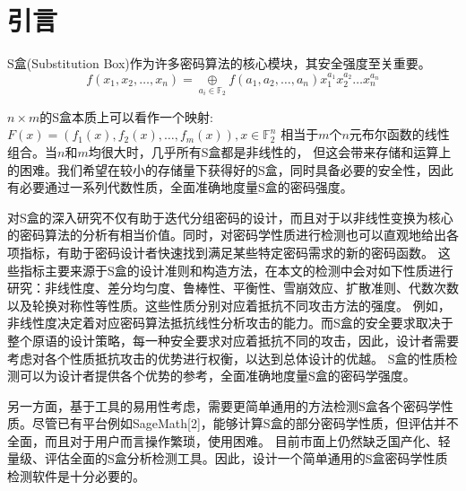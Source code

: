 \documentclass{xduugthesis}
\begin{document}
\frontmatter
\mainmatter
\chapter{引言}
S盒(Substitution Box)作为许多密码算法的核心模块，其安全强度至关重要。
\begin{equation}
    f(x_1,x_2,\dots ,x_n) = \mathop{\oplus}\limits_{a_i \in \mathbb{F}_2}f(a_1,a_2,\dots,a_n)x_1^{a_1}x_2^{a_2}\dots x_n^{a_n}
\end{equation}\par


$n\times m$的S盒本质上可以看作一个映射:$F(x) = (f_1(x), f_2(x),\dots , f_m(x)), x\in \mathbb{F}_2^n$
相当于$m$个$n$元布尔函数的线性组合。当$n$和$m$均很大时，几乎所有S盒都是非线性的，
但这会带来存储和运算上的困难。我们希望在较小的存储量下获得好的S盒，同时具备必要的安全性，因此有必要通过一系列代数性质，全面准确地度量S盒的密码强度。\par
对S盒的深入研究不仅有助于迭代分组密码的设计，而且对于以非线性变换为核心的密码算法的分析有相当价值。同时，对密码学性质进行检测也可以直观地给出各项指标，有助于密码设计者快速找到满足某些特定密码需求的新的密码函数。
这些指标主要来源于S盒的设计准则和构造方法，在本文的检测中会对如下性质进行研究：非线性度、差分均匀度、鲁棒性、平衡性、雪崩效应、扩散准则、代数次数以及轮换对称性等性质。这些性质分别对应着抵抗不同攻击方法的强度。
例如，非线性度决定着对应密码算法抵抗线性分析攻击的能力。而S盒的安全要求取决于整个原语的设计策略，每一种安全要求对应着抵抗不同的攻击，因此，设计者需要考虑对各个性质抵抗攻击的优势进行权衡，以达到总体设计的优越。
S盒的性质检测可以为设计者提供各个优势的参考，全面准确地度量S盒的密码学强度。\par
另一方面，基于工具的易用性考虑，需要更简单通用的方法检测S盒各个密码学性质。尽管已有平台例如SageMath[2]，能够计算S盒的部分密码学性质，但评估并不全面，而且对于用户而言操作繁琐，使用困难。
目前市面上仍然缺乏国产化、轻量级、评估全面的S盒分析检测工具。因此，设计一个简单通用的S盒密码学性质检测软件是十分必要的。\par
\end{document}
